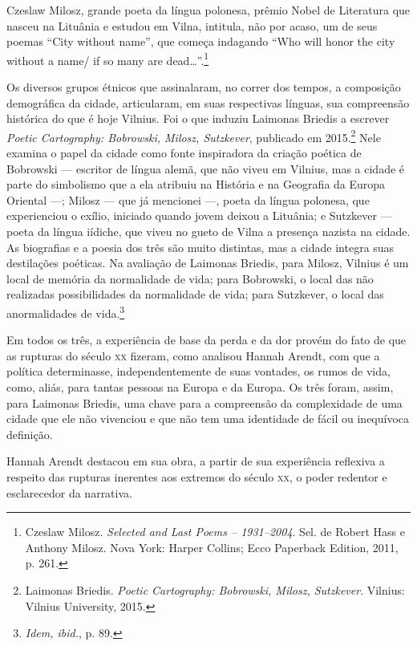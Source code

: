 Czeslaw Milosz, grande poeta da língua polonesa, prêmio Nobel de
Literatura que nasceu na Lituânia e estudou em Vilna, intitula, não por
acaso, um de seus poemas ``City without name'', que começa indagando
``Who will honor the city without a name/ if so many are
dead\ldots{}''.\footnote{Czeslaw Milosz. \textit{Selected and Last Poems --
  1931--2004}. Sel. de Robert Hass e Anthony Milosz. Nova York: Harper
  Collins; Ecco Paperback Edition, 2011, p. 261.}

Os diversos grupos étnicos que assinalaram, no correr dos tempos, a
composição demográfica da cidade, articularam, em suas respectivas
línguas, sua compreensão histórica do que é hoje Vilnius. Foi o que
induziu Laimonas Briedis a escrever \textit{Poetic Cartography:
 Bobrowski, Milosz, Sutzkever}, publicado em 2015.\footnote{Laimonas Briedis.
  \textit{Poetic Cartography: Bobrowski, Milosz, Sutzkever}. Vilnius: Vilnius University, 2015.} Nele examina
o papel da cidade como fonte inspiradora da criação poética de Bobrowski
--- escritor de língua alemã, que não viveu em Vilnius, mas a cidade é
parte do simbolismo que a ela atribuiu na História e na Geografia da
Europa Oriental ---; Milosz --- que já mencionei ---, poeta da língua
polonesa, que experienciou o exílio, iniciado quando jovem deixou a
Lituânia; e Sutzkever --- poeta da língua iídiche, que viveu no gueto de
Vilna a presença nazista na cidade. As biografias e a poesia dos três
são muito distintas, mas a cidade integra suas destilações poéticas. Na
avaliação de Laimonas Briedis, para Milosz, Vilnius é um local de
memória da normalidade de vida; para Bobrowski, o local das não
realizadas possibilidades da normalidade de vida; para Sutzkever, o
local das anormalidades de vida.\footnote{\textit{Idem, ibid.}, p. 89.}

Em todos os três, a experiência de base da perda e da dor provém do fato
de que as rupturas do século \textsc{xx} fizeram, como analisou Hannah Arendt,
com que a política determinasse, independentemente de suas vontades, os
rumos de vida, como, aliás, para tantas pessoas na Europa e da Europa.
Os três foram, assim, para Laimonas Briedis, uma chave para a
compreensão da complexidade de uma cidade que ele não vivenciou e que
não tem uma identidade de fácil ou inequívoca definição.

Hannah Arendt destacou em sua obra, a partir de sua experiência
reflexiva a respeito das rupturas inerentes aos extremos do século \textsc{xx}, o
poder redentor e esclarecedor da narrativa.

